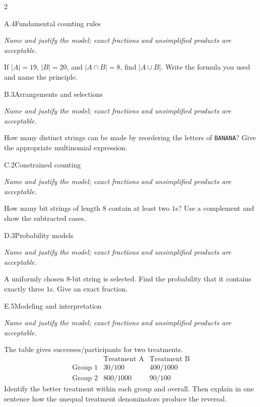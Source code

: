 \documentclass[9pt]{extarticle}
\begin{document}
\CoreWorkArea
\FormBreak
{}
\begin{multicols}{2}
\begin{CoreProblem}{A.4}{Fundamental counting rules}
{\scriptsize\textit{Name and justify the model; exact fractions and unsimplified products are acceptable.}\par}
If $|A|=19$, $|B|=20$, and $|A\cap B|=8$, find $|A\cup B|$. Write
    the formula you used and name the principle.
\end{CoreProblem}
\begin{CoreProblem}{B.3}{Arrangements and selections}
{\scriptsize\textit{Name and justify the model; exact fractions and unsimplified products are acceptable.}\par}
How many distinct strings can be made by reordering the letters of
    \texttt{BANANA}? Give the appropriate multinomial expression.
\end{CoreProblem}
\begin{CoreProblem}{C.2}{Constrained counting}
{\scriptsize\textit{Name and justify the model; exact fractions and unsimplified products are acceptable.}\par}
How many bit strings of length 8 contain at least two $1$s? Use a
    complement and show the subtracted cases.
\end{CoreProblem}
\columnbreak
\begin{CoreProblem}{D.3}{Probability models}
{\scriptsize\textit{Name and justify the model; exact fractions and unsimplified products are acceptable.}\par}
A uniformly chosen 8-bit string is selected. Find the probability
    that it contains exactly three $1$s. Give an exact fraction.
\end{CoreProblem}
\begin{CoreProblem}{E.5}{Modeling and interpretation}
{\scriptsize\textit{Name and justify the model; exact fractions and unsimplified products are acceptable.}\par}
The table gives successes/participants for two treatments.
    \[
    \begin{array}{c|cc}
      &\text{Treatment A}&\text{Treatment B}\\\hline
      \text{Group 1}&30/100&400/1000\\
      \text{Group 2}&800/1000&90/100
    \end{array}
    \]
    Identify the better treatment within each group and overall. Then explain in
    one sentence how the unequal treatment denominators produce the reversal.
\end{CoreProblem}
\end{multicols}
\end{document}
